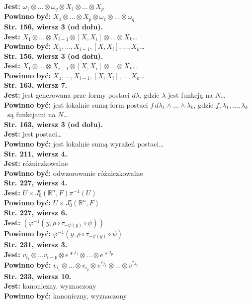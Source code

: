 \documentclass[a4paper,11pt]{article}
\newcommand{\mb}{\mathbb}
\newcommand{\ld}{\ldots}
\newcommand{\ti}{\times}
\newcommand{\ot}{\otimes}
\newcommand{\we}{\wedge}
\newcommand{\vp}{\varphi}
\newcommand{\la}{\lambda}
\newcommand{\om}{\omega}
\newcommand{\R}{\mb{R}}
\newcommand{\tb}{\textbf}
\newcommand{\StrWg}[2]{\tb{Str. #1, wiersz #2.}}
\newcommand{\StrWd}[2]{\tb{Str. #1, wiersz #2 (od dołu).}}
\newcommand{\Jest}{\tb{Jest: }}
\newcommand{\Pow}{\tb{Powinno być: }}
\begin{document}
\Jest $\om_{ 1 } \ot \ld \ot \om_{ q } \ot X_{ 1 } \ot \ld
\ot X_{ p }$ \\
\Pow $X_{ 1 } \ot \ld \ot X_{ p } \ot \om_{ 1 } \ot \ld \ot
\om_{ q }$ \\
\StrWd{156}{3} \\
\Jest $X_{ 1 } \ot \ld \ot X_{ i - 1 } \ot [ X, X_{ i } ] \ot \ld
\ot X_{ k }$\ld \\
\Pow $X_{ 1 }, \ld, X_{ i - 1 }, [ X, X_{ i } ], \ld, X_{ k }$\ldots \\
\StrWd{156}{3} \\
\Jest $X_{ 1 } \ot \ld \ot X_{ i - 1 } \ot [ X, X_{ i } ] \ot \ld
\ot X_{ k }$\ld \\
\Pow $X_{ 1 }, \ld, X_{ i - 1 }, [ X, X_{ i } ], \ld, X_{ k }$\ld \\
\StrWg{163}{7} \\
\Jest jest generowana prze formy postaci $d \la$, gdzie $\la$
jest funkcją na $N$\ld \\
\Pow jest lokalnie sumą form postaci
$f\, d\la_{ 1 } \we \ldots \we \la_{ k }$, gdzie
$f, \la_{ 1 }, \ld, \la_{ k }$~są funkcjami na $N$\ld \\
\StrWd{163}{3} \\
\Jest jest postaci\ldots \\
\Pow jest lokalnie sumą wyrażeń postaci\ld \\
\StrWg{211}{4} \\
\Jest różniczkowalne \\
\Pow odwzorowanie różniczkowalne \\
\StrWg{227}{4} \\
\Jest $U \ti J^{ r }_{ 0 }( \R^{ n }, F ) \pi^{ -1 }( U )$ \\
\Pow $U \ti J^{ r }_{ 0 }( \R^{ n }, F )$ \\
\StrWg{227}{6} \\
\Jest $( \vp^{ -1 }( y, \rho \circ \tau_{ -\psi( y ) } \circ \psi ) )$ \\
\Pow $\vp^{ -1 }( y, \rho \circ \tau_{ -\psi( y ) } \circ \psi )$ \\
\StrWg{231}{3} \\
\Jest $v_{ i_{ 1 } } \ot \ld v_{ i - p } \ot { e* }^{ j_{ 1 } } \ot
\ld \ot { e* }^{ j_{ p } }$ \\
\Pow $v_{ i_{ 1 } } \ot \ld \ot v_{ i_{ p } } \ot v^{ * j_{ 1 } } \ot
\ld \ot v^{ * j_{ p } }$ \\
\StrWg{233}{10} \\
\Jest kanoniczny. wyznaczony \\
\Pow  kanoniczny, wyznaczony \\
\end{document}
